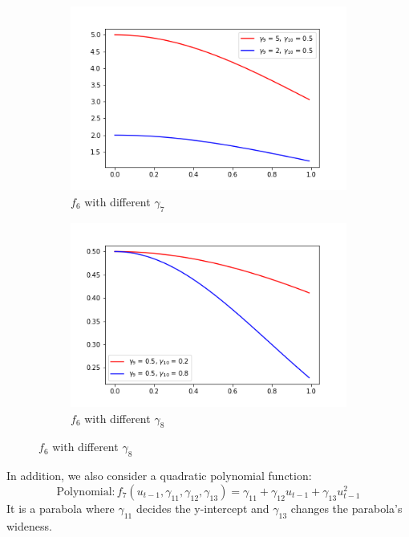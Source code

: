 \documentclass[a4paper,12pt,times,numbered,print,index]{report}
\numberwithin{equation}{section}
\begin{document}
	\begin{figure}[!htbp]
	\centering
	\caption{$f_{6}\left(x_{t-1}^{\prime }\theta _{0},\gamma_{0}\right)$ with different $\gamma$}
	\begin{subfigure}[b]{0.44\linewidth}
		\includegraphics[width=\linewidth]{plots/scale_exp_g9.png}
		\caption{$f_{6}$ with different $\gamma_{7}$}
		\label{param_g9}
	\end{subfigure}
	\begin{subfigure}[b]{0.44\linewidth}
		\includegraphics[width=\linewidth]{plots/scale_exp_g10.png}
		\caption{$f_{6}$ with different $\gamma_{8}$}
		\label{param_g10}
	\end{subfigure}
	\label{exp2}
	\end{figure}

In addition, we also consider a quadratic polynomial function:
$$
	\text{Polynomial}: f_{7}\left( u_{t-1},\gamma_{11}, \gamma_{12}, \gamma_{13}\right) = \gamma_{11}+ \gamma_{12}u_{t-1}+\gamma_{13}u_{t-1}^{2}
$$
It is a parabola where $\gamma_{11}$ decides the y-intercept and $\gamma_{13}$ changes the parabola's wideness.
\end{document}

